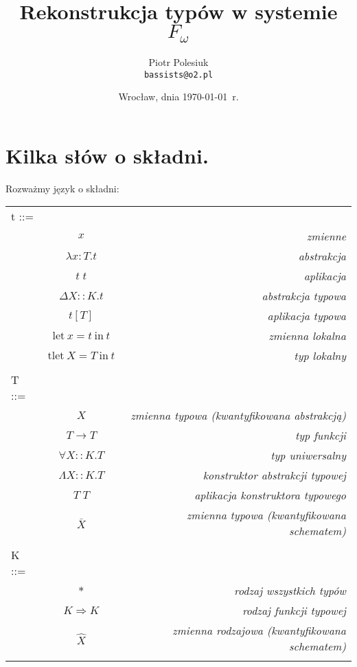 \documentclass[11pt,leqno]{article}
\title{{\textbf{Rekonstrukcja typów w systemie $F_{\omega}$}}\\[1ex]}
\date{Wrocław, dnia \today\ r.}
\author{Piotr Polesiuk \\ \texttt{bassists@o2.pl}}
\begin{document}
\thispagestyle{empty}
\maketitle

\pagebreak

\theoremstyle{plain}
\newtheorem{twierdzenie}{Twierdzenie}
\newtheorem{lemat}{Lemat}
\newtheorem{fakt}{Fakt}

\theoremstyle{definition}
\newtheorem{definicja}{Definicja}

\section{Kilka słów o składni.}
\setcounter{equation}{0}

Rozważmy język o składni:

\begin{tabular}{| l c r |}
  \hline
  t ::= &  &  \\
   & $x$ & \textit{zmienne}  \\
   & $\lambda x:T.t$ & \textit{abstrakcja} \\
   & $t\;t$ & \textit{aplikacja} \\
   & $\Delta X::K.t$ & \textit{abstrakcja typowa} \\
   & $t[T]$ & \textit{aplikacja typowa} \\
   & $\textrm{let} \ x = t \ \textrm{in} \ t$ & \textit{zmienna lokalna} \\
   & $\textrm{tlet} \ X = T \ \textrm{in} \ t$ & \textit{typ lokalny} \\
   & & \\
  T ::= &  &  \\
   & $X$ & \textit{zmienna typowa (kwantyfikowana abstrakcją)} \\
   & $T \rightarrow T$ & \textit{typ funkcji} \\
   & $\forall X::K.T$ & \textit{typ uniwersalny} \\
   & $\Lambda X::K.T$ & \textit{konstruktor abstrakcji typowej} \\
   & $T\;T$ & \textit{aplikacja konstruktora typowego} \\
   & $\bar{X}$ & \textit{zmienna typowa (kwantyfikowana schematem)} \\
   & & \\
  K ::= & & \\
   & $*$ & \textit{rodzaj wszystkich typów} \\
   & $K \Rightarrow K$ & \textit{rodzaj funkcji typowej} \\
   & $\widehat{X}$ & \textit{zmienna rodzajowa (kwantyfikowana schematem)} \\
   & & \\
  \hline
\end{tabular} \\
\end{document}
